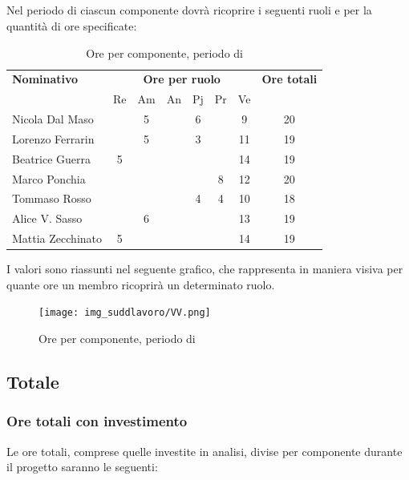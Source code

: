 \subsection{\VV}
Nel periodo di \VV{} ciascun componente dovrà ricoprire i seguenti ruoli e per la quantità di ore specificate:

\begin{table}[H]
	\centering
	\begin{tabular}{|l|c|c|c|c|c|c|c|}
		\hline
		\textbf{Nominativo} & 
		\multicolumn{6}{c|}{\textbf{Ore per ruolo}} & 
		\textbf{Ore totali} \\
		& Re & Am & An & Pj & Pr & Ve & \\
		\hline
		Nicola Dal Maso & &5 & &6 & &9 & 20 \\
		Lorenzo Ferrarin & &5 & &3 & &11 & 19 \\
		Beatrice Guerra &5 & & & & &14 & 19 \\
		Marco Ponchia & & & & &8 &12 & 20 \\
		Tommaso Rosso & & & &4 &4 &10 & 18 \\
		Alice V. Sasso & &6 & & & &13 & 19 \\
		Mattia Zecchinato &5 & & & & &14 & 19 \\
		\hline
	\end{tabular}
	\caption{Ore per componente, periodo di \VV{}}
\end{table}
I valori sono riassunti nel seguente grafico, che rappresenta in maniera visiva per quante ore un membro ricoprirà un determinato ruolo.
\begin{figure}[H]
	\centering
	\texttt{[image: img\_suddlavoro/VV.png]}
	\caption{Ore per componente, periodo di \VV{}}
\end{figure}

\subsection{Totale}
\subsubsection{Ore totali con investimento}
Le ore totali, comprese quelle investite in analisi, divise per componente durante il progetto saranno le seguenti:

